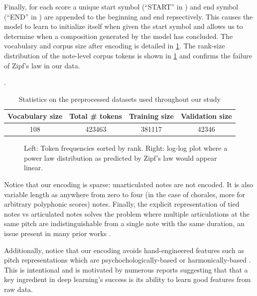 Finally, for each score a unique start symbol (``START'' in )
and end symbol (``END'' in ) are appended to the beginning and
end repsectively. This causes the model to learn to initialize itself when
given the start symbol and allows us to determine when a composition generated
by the model has concluded. The vocabulary and corpus size after encoding is
detailed in \cref{tab:encoded-corpus-stats}. The rank-size distribution of the
note-level corpus tokens is shown in \cref{fig:zipf} and confirms the failure
of Zipf's law in our data.

\begin{table}[tb]
  \centering
  \caption{Statistics on the preprocessed datasets used throughout our study}
  \label{tab:encoded-corpus-stats}.
  \begin{tabular}{c c c c}
    \toprule
    Vocabulary size & Total \# tokens & Training size & Validation size \\
    \midrule
    108 & 423463 & 381117 & 42346 \\
    \bottomrule
  \end{tabular}
\end{table}

\begin{figure}[tb]
  \centering
  
  \caption{Left: Token frequencies sorted by rank. Right: log-log plot where
  a power law distribution as predicted by Zipf's law would appear linear.}
  \label{fig:zipf}
\end{figure}

Notice that our encoding is sparse: unarticulated notes are not encoded. It is
also variable length as anywhere from zero to four (in the case of chorales,
more for arbitrary polyphonic scores) notes. Finally, the explicit
representation of tied notes vs articulated notes solves the problem where
multiple articulations at the same pitch are indistinguishable from a single
note with the same duration, an issue present in many prior works
\citep{Eck2002,eck2008learning,Liu2014,Brien2016}.

Additionally, notice that our encoding avoids hand-engineered features such as
pitch representations which are psychochologically-based \citep{mozer1994neural}
or harmonically-based \citep{franklin2004recurrent}
\citep{laden1989representation}. This is intentional and is motivated by
numerous reports \citep{bengio2009learning}\citep{Bengio2011} suggesting that
that a key ingredient in deep learning's success is its ability to learn good
features from raw data.

